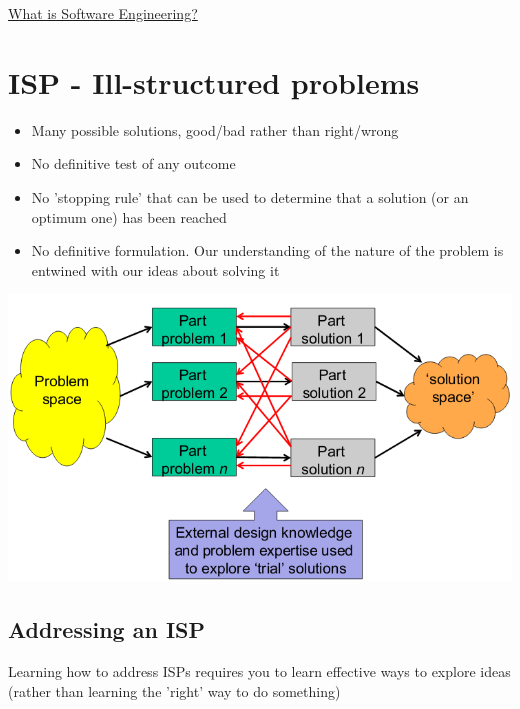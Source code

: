 \documentclass{article}[18pt]
\begin{document}
\begin{center}
\underline{\huge What is Software Engineering?}
\end{center} 
\section{ISP - Ill-structured problems}
\begin{itemize}
	\item Many possible solutions, good/bad rather than right/wrong
	\item No definitive test of any outcome
	\item No 'stopping rule' that can be used to determine that a solution (or an optimum one) has been reached
	\item No definitive formulation. Our understanding of the nature of the problem is entwined with our ideas about solving it
\end{itemize}
\begin{center}
	\includegraphics[scale=0.7]{ISP}
\end{center}
\subsection{Addressing an ISP}
Learning how to address ISPs requires you to learn effective ways to explore ideas (rather than learning the 'right' way to do something)
\end{document}

